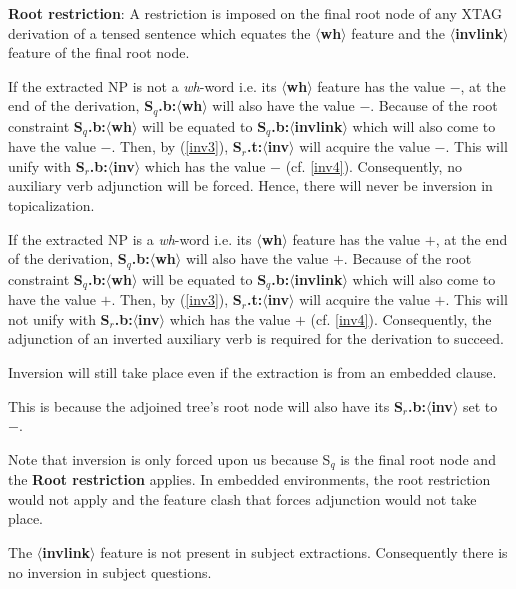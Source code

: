  
\noindent 
{\bf Root restriction}: A restriction is imposed on the final root 
node of any XTAG derivation of a tensed sentence which equates the 
{\bf $\langle$wh$\rangle$} feature and the {\bf $\langle$invlink$\rangle$} feature of the final root node. 
 
If the extracted NP is not a {\em wh}-word i.e. its {\bf $\langle$wh$\rangle$} feature has the value $-$, at the end of the 
derivation, {\bf S$_{q}$.b:$\langle$wh$\rangle$} will also have the 
value $-$. Because of the root constraint {\bf S$_{q}$.b:$\langle$wh$\rangle$} will be equated to {\bf S$_{q}$.b:$\langle$invlink$\rangle$} which will also come to have the 
value $-$. Then, by (\ref{inv3}), {\bf S$_{r}$.t:$\langle$inv$\rangle$} will acquire the value $-$. This will 
unify with {\bf S$_{r}$.b:$\langle$inv$\rangle$} which has the value 
$-$ (cf. \ref{inv4}). Consequently, no auxiliary verb adjunction will 
be forced. Hence, there will never be inversion in topicalization. 
 
If the extracted NP is a {\em wh}-word i.e. its {\bf $\langle$wh$\rangle$} 
feature has the value $+$, at the end of the derivation, 
{\bf S$_{q}$.b:$\langle$wh$\rangle$} will also have the value $+$. Because of 
the root constraint {\bf S$_{q}$.b:$\langle$wh$\rangle$} will be equated 
to {\bf S$_{q}$.b:$\langle$invlink$\rangle$} which will also come to have 
the value $+$. Then, by (\ref{inv3}), {\bf S$_{r}$.t:$\langle$inv$\rangle$} 
will acquire the value $+$. This will not unify with {\bf S$_{r}$.b:$\langle$inv$\rangle$} 
which has the value $+$ (cf. \ref{inv4}). Consequently, the adjunction 
of an inverted auxiliary verb is required for the derivation to succeed. 
 
Inversion will still take place even if the extraction is from an embedded 
clause. 
 
\beginsentences
{}\label{ex:207} 
\endsentences

 
This is because the adjoined tree's root node will also have its 
{\bf S$_{r}$.b:$\langle$inv$\rangle$} set to $-$. 
 
 
Note that inversion is only forced upon us because S$_{q}$ is the 
final root node and the {\bf Root restriction} applies. In embedded 
environments, the root restriction would not apply and the feature 
clash that forces adjunction would not take place. 
 
The {\bf $\langle$invlink$\rangle$} feature is not present in subject 
extractions.  Consequently there is no inversion in subject questions. 
 
